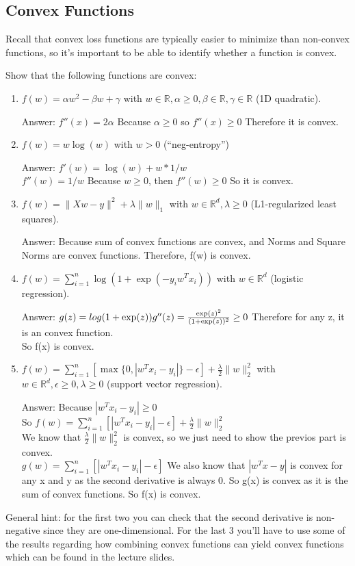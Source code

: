 \documentclass{article}
\def\ans#1{\par\gre{Answer: #1}}
\def\blu#1{{\color{blu}#1}}
\def\gre#1{{\color{gre}#1}}
\def\norm#1{\|#1\|}
\def\R{\mathbb{R}}
\def\enum#1{\begin{enumerate}#1\end{enumerate}}
\begin{document}
\subsection{Convex Functions}

Recall that convex loss functions are typically easier to minimize than non-convex functions, so it's important to be able to identify whether a function is convex.

\blu{Show that the following functions are convex}:

\enum{
\item $f(w) = \alpha w^2 - \beta w + \gamma$ with $w \in \R, \alpha \geq 0, \beta \in \R, \gamma \in \R$ (1D quadratic). \ans{$f''(x) = 2\alpha$ Because $\alpha \geq 0$ so $f''(x) \geq 0$ Therefore it is convex. }
\item $f(w) = w\log(w) $ with $w > 0$ (``neg-entropy'') \ans{$f'(w) = \log(w) + w * 1/w$ \\$f''(w) = 1/w$ Because $w\geq 0$, then $f''(w) \geq 0$ So it is convex.}
\item $f(w) = \norm{Xw-y}^2 + \lambda\norm{w}_1$ with $w \in \R^d, \lambda \geq 0$ (L1-regularized least squares). \ans{Because sum of convex functions are convex, and Norms and Square Norms are convex functions. Therefore, f(w) is convex.}
\item $f(w) = \sum_{i=1}^n \log(1+\exp(-y_iw^Tx_i)) $ with $w \in \R^d$ (logistic regression). \ans{
    $g(z) = log(1+\exp(z))\\
    g''(z) = \frac{\exp(z)^2}{(1+\exp(z))^2} \geq 0$
    Therefore for any z, it is an convex function.
    \\So f(x) is convex.
}
\item $f(w) = \sum_{i=1}^n[\max\{0,|w^Tx_i - y_i|\} - \epsilon] + \frac{\lambda}{2}\norm{w}_2^2$  with $w \in \R^d, \epsilon \geq 0, \lambda \geq 0$ (support vector regression).
\ans{ 
Because $|w^Tx_i - y_i|\geq 0$ \\
So $f(w) = \sum_{i=1}^n[|w^Tx_i - y_i| - \epsilon] + \frac{\lambda}{2}\norm{w}_2^2$\\
We know that $\frac{\lambda}{2}\norm{w}_2^2$ is convex, so we just need to show the previos part is convex.\\
$g(w) = \sum_{i=1}^n[|w^Tx_i - y_i| - \epsilon]$
We also know that $|w^Tx - y|$ is convex for any x and y as the second derivative is always 0.
So g(x) is convex as it is the sum of convex functions. 
So f(x) is convex.
}}

General hint: for the first two you can check that the second derivative is non-negative since they are one-dimensional. For the last 3 you'll have to use some of the results regarding how combining convex functions can yield convex functions which can be found in the lecture slides.
\end{document}
